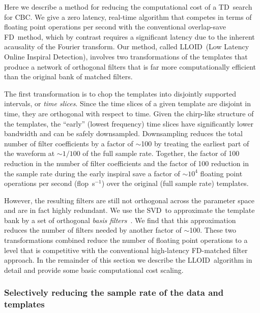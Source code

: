 \documentclass[preprint2]{aastex}
\newcommand{\SVD}{SVD}%
\newcommand{\flops}{flop~s$^{-1}$}
\newcommand{\lloid}{LLOID}%
\newcommand{\TD}{TD}%
\newcommand{\FD}{FD}%
\begin{document}
Here we describe a method for reducing the computational cost of a \TD\ search
for CBC.  We give a zero latency, real-time algorithm
that competes in terms of floating point operations per second with the
conventional overlap-save \FD\ method, which by contrast requires a significant latency due
to the inherent acausality of the Fourier transform.  Our method, called \lloid\
(Low Latency Online Inspiral Detection), involves two transformations of the
templates that produce a network of orthogonal filters that is far more
computationally efficient than the original bank of matched filters.

The first transformation is to chop the templates into disjointly supported
intervals, or \emph{time slices}.  Since the time slices of a given template
are disjoint in time, they are orthogonal with respect to time.  Given the
chirp-like structure of the templates, the ``early'' (lowest frequency) time
slices have significantly lower bandwidth and can be safely downsampled.
Downsampling reduces the total number of filter coefficients by a factor of
$\sim$100 by treating the earliest part of the waveform at $\sim$$1/100$ of
the full sample rate.  Together, the factor of 100 reduction in the number of
filter coefficients and the factor of 100 reduction in the sample rate during the early inspiral save a
factor of $\sim$$10^4$ floating point operations per second (\flops) over the
original (full sample rate) templates.

However, the resulting filters are still not
orthogonal across the parameter space and are in fact highly redundant.
We use the \SVD\ to approximate the template bank by a set of orthogonal
\emph{basis filters}~\citep{Cannon:2010p10398}.  We find that this approximation
reduces the number of filters needed by another factor of $\sim$100.  These two
transformations combined reduce the number of floating point operations
to a level that is competitive with the conventional high-latency \FD-matched filter approach.  In the remainder of this section we describe the
\lloid\ algorithm in detail and provide some basic computational cost scaling.

\subsubsection{Selectively reducing the sample rate of the data and templates}
\label{sec:time-slices}
\end{document}
